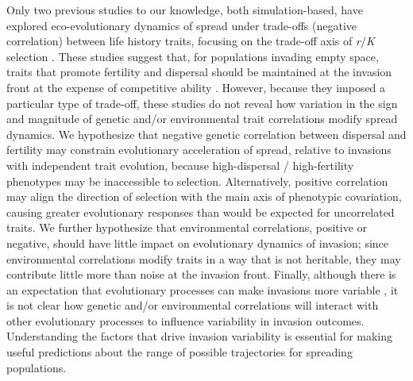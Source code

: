 \documentclass[11pt]{article}
\newcommand{\tom}[1]{{\textit{\color{WildStrawberry}{[#1]}}}}
\begin{document}
Only two previous studies to our knowledge, both simulation-based, have explored eco-evolutionary dynamics of spread under trade-offs (negative correlation) between life history traits, focusing on the trade-off axis of \textit{r}/\textit{K} selection \citep{burton_trade-offs_2010,perkins_after_2016}.
These studies suggest that, for populations invading empty space, traits that promote fertility and dispersal should be maintained at the invasion front at the expense of competitive ability \citep{burton_trade-offs_2010,perkins_after_2016}.
However, because they imposed a particular type of trade-off, these studies do not reveal how variation in the sign and magnitude of genetic and/or environmental trait correlations modify spread dynamics.
We hypothesize that negative genetic correlation between dispersal and fertility may constrain evolutionary acceleration of spread, relative to invasions with independent trait evolution, because high-dispersal / high-fertility phenotypes may be inaccessible to selection. %
Alternatively, positive correlation may align the direction of selection with the main axis of phenotypic covariation, causing greater evolutionary responses than would be expected for uncorrelated traits.
We further hypothesize that environmental correlations, positive or negative, should have little impact on evolutionary dynamics of invasion; since environmental correlations modify traits in a way that is not heritable, they may contribute little more than noise at the invasion front.
Finally, although there is an expectation that evolutionary processes can make invasions more variable \citep{phillips_evolutionary_2015,ochocki_rapid_2017,weiss-lehman_rapid_2017}, it is not clear how genetic and/or environmental correlations will interact with other evolutionary processes to influence variability in invasion outcomes.
Understanding the factors that drive invasion variability is essential for making useful predictions about the range of possible trajectories for spreading populations.
\end{document}
